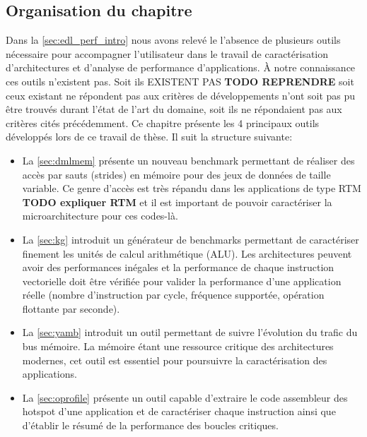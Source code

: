 \subsection{Organisation du chapitre}
    
    Dans la \autoref{sec:edl_perf_intro} nous avons relevé le l'absence de plusieurs outils nécessaire pour accompagner l'utilisateur dans le travail de caractérisation d'architectures et d'analyse de performance d'applications. À notre connaissance ces outils n'existent pas. Soit ils EXISTENT PAS \textbf{TODO REPRENDRE} soit ceux existant ne répondent pas aux critères de développements n'ont soit pas pu être trouvés durant l'état de l'art du domaine, soit ils ne répondaient pas aux critères cités précédemment. Ce chapitre présente les 4 principaux outils développés lors de ce travail de thèse. Il suit la structure suivante:
   
   \begin{itemize}
       \item La \autoref{sec:dmlmem} présente un nouveau \gls{benchmark} permettant de réaliser des accès par sauts (strides) en mémoire pour des jeux de données de taille variable. Ce genre d'accès est très répandu dans les applications de type RTM \textbf{TODO expliquer RTM} et il est important de pouvoir caractériser la microarchitecture pour ces codes-là.
       \item La \autoref{sec:kg} introduit un générateur de benchmarks permettant de caractériser finement les unités de calcul arithmétique (ALU). Les architectures peuvent avoir des performances inégales et la performance de chaque instruction vectorielle doit être vérifiée pour valider la performance d'une application réelle (nombre d'instruction par cycle, fréquence supportée, opération flottante par seconde).
       \item La \autoref{sec:yamb} introduit un outil permettant de suivre l'évolution du trafic du bus mémoire. La mémoire étant une ressource critique des architectures modernes, cet outil est essentiel pour poursuivre la caractérisation des applications.
       \item La \autoref{sec:oprofile} présente un outil capable d'extraire le code assembleur des \gls{hotspot} d'une application et de caractériser chaque instruction ainsi que d'établir le résumé de la performance des boucles critiques.
   \end{itemize}
   
     


